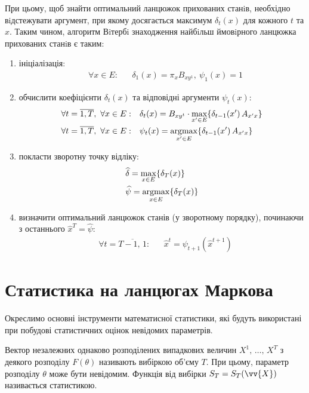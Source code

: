 При цьому, щоб знайти оптимальний ланцюжок прихованих станiв, необхідно вiдстежувати аргумент, при якому досягається максимум $\delta_t(x)$ для кожного $t$ та $x$. Таким чином, алгоритм Вiтербi знаходження найбiльш ймовiрного ланцюжка прихованих станiв є таким:

\begin{enumerate}
    \item ініціалізація:
    \begin{align*}
        &\forall x \in E: && \delta_1(x)=\pi_{x}B_{xy^1}, \ \psi_1(x)=1
    \end{align*}    
    \item обчислити коефіцієнти $\delta_t(x)$ та відповідні аргументи $\psi_t(x):$
    \begin{align*}
        &\forall t=\overline{1,T}, \ \forall x \in E: && \delta_{t}(x)=B_{xy^{t}}\cdot\max_{x'\in E}\{\delta_{t-1}(x')\,A_{x'x}\} \\
        &\forall t=\overline{1,T}, \ \forall x \in E: && \psi_{t}(x)=\operatorname*{argmax}_{x'\in E}\{\delta_{t-1}(x')\,A_{x'x}\}
    \end{align*}
    \item покласти зворотну точку відліку:
    \begin{align*}
        &\widehat{\delta}=\max_{x \in E}\{\delta_T(x)\} \\
        &\widehat{\psi}=\operatorname*{argmax}_{x \in E}\{\delta_T(x)\}
    \end{align*}
    \item визначити оптимальний ланцюжок станів (у зворотному порядку), починаючи з останнього $\widehat{x}^T=\widehat{\psi}:$
    \begin{align*}
        &\forall t=\overline{T-1,\,1}: && \widehat{x}^t=\psi_{t+1}(\widehat{x}^{t+1})
    \end{align*}
\end{enumerate}

\section{Статистика на ланцюгах Маркова}

Окреслимо основні інструменти математисної статистики, які будуть використані при побудові статистичних оцінок невідомих параметрів.

Вектор незалежних однаково розподілених випадкових величин $X^1,\,\ldots,\,X^T$ з деякого розподілу $F(\theta)$ називають вибіркою об'єму $T$. При цьому, параметр розподілу $\theta$ може бути невідомим. Функція від вибірки $S_T=S_T(\vv{X})$ називається статистикою. 

